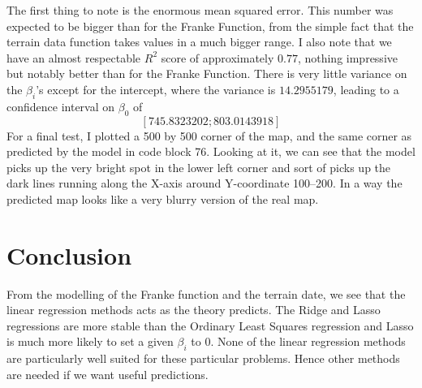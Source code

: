 \documentclass[parskip=half]{scrartcl}
\theoremstyle{definition}
\theoremstyle{remark}
\begin{document}
The first thing to note is the enormous mean squared error. 
This number was expected to be bigger than for the Franke Function, from the simple fact that the terrain data function takes values in a much bigger range. 
I also note that we have an almost respectable $R^2$ score of approximately $0.77$, nothing impressive but notably better than for the Franke Function. 
There is very little variance on the $\beta_i$'s except for the intercept, where the variance is $14.2955179$, leading to a confidence interval on $\beta_0$ of 
\[
	[745.8323202; 803.0143918]
\]
For a final test, I plotted a 500 by 500 corner of the map, and the same corner as predicted by the model in code block 76. 
Looking at it, we can see that the model picks up the very bright spot in the lower left corner and sort of picks up the dark lines running along the X-axis around Y-coordinate 100--200. 
In a way the predicted map looks like a very blurry version of the real map. 

\section{Conclusion}

From the modelling of the Franke function and the terrain date, we see that the linear regression methods acts as the theory predicts.
The Ridge and Lasso regressions are more stable than the Ordinary Least Squares regression and Lasso is much more likely to set a given $\beta_i$ to $0$. 
None of the linear regression methods are particularly well suited for these particular problems. 
Hence other methods are needed if we want useful predictions. 

\newpage

\end{document}
